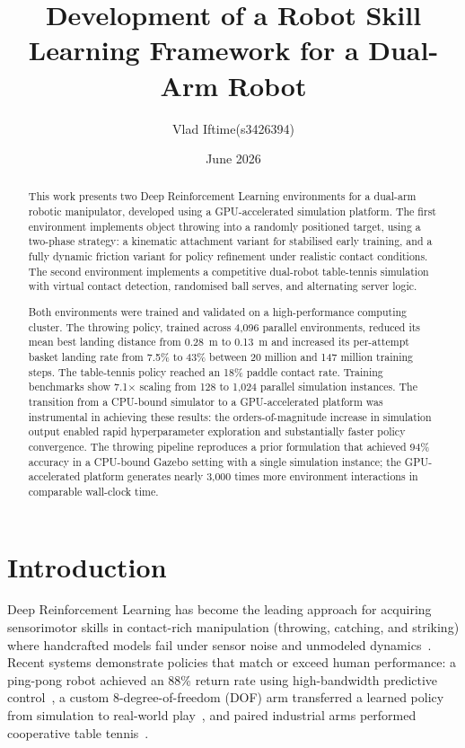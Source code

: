 \documentclass[11pt, a4paper]{article}
\title{\textbf{Development of a Robot Skill Learning Framework for a Dual-Arm Robot}}
\author{Vlad Iftime(s3426394)}
\date{June 2026}
\begin{document}
\maketitle

\begin{abstract}
This work presents two Deep Reinforcement Learning environments for a dual-arm robotic manipulator, developed using a GPU-accelerated simulation platform. The first environment implements object throwing into a randomly positioned target, using a two-phase strategy: a kinematic attachment variant for stabilised early training, and a fully dynamic friction variant for policy refinement under realistic contact conditions. The second environment implements a competitive dual-robot table-tennis simulation with virtual contact detection, randomised ball serves, and alternating server logic.

Both environments were trained and validated on a high-performance computing cluster. The throwing policy, trained across 4,096 parallel environments, reduced its mean best landing distance from 0.28~m to 0.13~m and increased its per-attempt basket landing rate from 7.5\% to 43\% between 20 million and 147 million training steps. The table-tennis policy reached an 18\% paddle contact rate. Training benchmarks show 7.1$\times$ scaling from 128 to 1,024 parallel simulation instances. The transition from a CPU-bound simulator to a GPU-accelerated platform was instrumental in achieving these results: the orders-of-magnitude increase in simulation output enabled rapid hyperparameter exploration and substantially faster policy convergence. The throwing pipeline reproduces a prior formulation that achieved 94\% accuracy in a CPU-bound Gazebo setting with a single simulation instance; the GPU-accelerated platform generates nearly 3,000 times more environment interactions in comparable wall-clock time.
\end{abstract}

\section{Introduction}
\label{sec:intro}

Deep Reinforcement Learning has become the leading approach for acquiring sensorimotor skills in contact-rich manipulation (throwing, catching, and striking) where handcrafted models fail under sensor noise and unmodeled dynamics~\cite{plappert2021asymmetric,sukhbaatar2018learning}. Recent systems demonstrate policies that match or exceed human performance: a ping-pong robot achieved an 88\% return rate using high-bandwidth predictive control~\cite{mit_pingpong}, a custom 8-degree-of-freedom (DOF) arm transferred a learned policy from simulation to real-world play~\cite{sony_ace}, and paired industrial arms performed cooperative table tennis~\cite{columbia_tt}.
\end{document}
